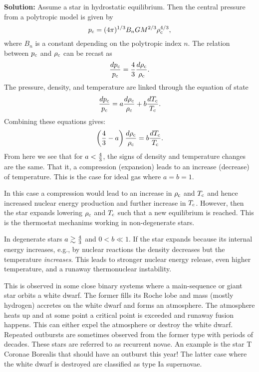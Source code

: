 \documentclass[12pt]{article}
\def\rhoc{\textcolor{red}{\rho}}
\def\ppc{p_{\rm c}}
\def\TTc{T_{\rm c}}
\def\rhoc{\rho_{\rm c}}
\def\fourthirds{{\textstyle{4\over3}}}
\begin{document}
{\bf Solution:} Assume a star in hydrostatic equilibrium. Then the
central pressure from a polytropic model is given by
\begin{equation}
\ppc = (4\pi)^{1/3} B_n G M^{2/3} \rhoc^{4/3},
\end{equation}
where $B_n$ is a constant depending on the polytropic index $n$. The
relation between $p_{\rm c}$ and $\rho_{\rm c}$ can be recast as
\begin{equation}
\frac{d\ppc}{\ppc} = \frac{4}{3}\frac{d\rhoc}{\rhoc}.
\end{equation}
The pressure, density, and temperature are linked through
the equation of state
\begin{equation}
\frac{d\ppc}{\ppc} = a\frac{d\rhoc}{\rhoc} + b\frac{d\TTc}{\TTc}.
\end{equation}
Combining these equations gives:
\begin{equation}
\left(\frac{4}{3} - a \right) \frac{d\rhoc}{\rhoc} = b\frac{d\TTc}{\TTc}.
\end{equation}
From here we see that for $a<\fourthirds$, the signs of density and
temperature changes are the same. That it, a compression (expansion)
leads to an increase (decrease) of temperature. This is the case for
ideal gas where $a=b=1$.

In this case a compression would lead to an increase in $\rhoc$ and
$\TTc$ and hence increased nuclear energy production and further
increase in $\TTc$. However, then the star expands lowering $\rhoc$
and $\TTc$ such that a new equilibrium is reached. This is the
thermostat mechanims working in non-degenerate stars.

In degenerate stars $a\gtrsim \fourthirds$ and $0<b\ll1$. If the star
expands because its internal energy increases, e.g., by nuclear
reactions the density decreases but the temperature
\emph{increases}. This leads to stronger nuclear energy release, even
higher temperature, and a runaway thermonuclear instability.

This is observed in some close binary systems where a main-sequence or
giant star orbits a white dwarf. The former fills its Roche lobe and
mass (mostly hydrogen) accretes on the white dwarf and forms an
atmosphere. The atmosphere heats up and at some point a critical point
is exceeded and runaway fusion happens. This can either expel the
atmosphere or destroy the white dwarf. Repeated outbursts are
sometimes observed from the former type with periods of decades. These
stars are referred to as recurrent novae. An example is the star T
Coronae Borealis that should have an outburst this year! The latter
case where the white dwarf is destroyed are classified as type Ia
supernovae.
\end{document}
